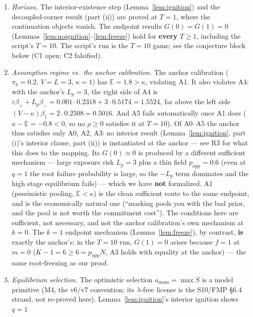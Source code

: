 \begin{remark}\label{rem:ledger}
\leavevmode
\begin{enumerate}
\item \emph{Horizon.} The interior-existence step (Lemma~\ref{lem:ignition}) and the
decoupled-corner result (part (ii)) are proved at $T=1$, where the continuation objects
vanish. The endpoint results $G(0)=G(1)=0$ (Lemmas~\ref{lem:noignition}--\ref{lem:freeze})
hold for \textbf{every} $T\ge 1$, including the script's $T=10$. The script's run is the
$T=10$ game; see the conjecture block below (C1 open; C2 falsified).
\item \emph{Assumption regime vs.\ the anchor calibration.} The anchor calibration
($\pi_b=0.2$, $V=L=3$, $\kappa=1$) has $\mathbb E=1.8>\kappa$, violating A1. It also violates
A4: with the anchor's $L_p=3$, the right side of A4 is
$\varepsilon\beta_++L_p\beta_-=0.001\cdot 0.2318+3\cdot 0.5174=1.5524$, far above the left
side $(V-\kappa)\beta_1=2\cdot 0.2508=0.5016$. And A5 fails automatically once A1 does
($\kappa-\mathbb E=-0.8<0$, so no $\rho\ge 0$ satisfies it at $T=10$). Of A0--A5 the anchor
thus satisfies only A0, A2, A3: no interior result (Lemma~\ref{lem:ignition}, part (i)'s
interior clause, part (ii)) is instantiated at the anchor --- see R3 for what this does to the
mapping. Its $G(0)\approx 0$ is produced by a different sufficient mechanism --- large exposure
risk $L_p=3$ plus a thin field $p_{\mathrm{opp}}=0.6$ (even at $q=1$ the root failure
probability is large, so the $-L_p$ term dominates and the high stage equilibrium fails) ---
which we have \textbf{not} formalized. A1 (pessimistic pooling, $\mathbb E<\kappa$) is the
clean sufficient route to the same endpoint, and is the economically natural one (``masking
pools you with the bad prior, and the pool is not worth the commitment cost''). The conditions
here are sufficient, not necessary, and not the anchor calibration's own mechanism at $k=0$.
The $k=1$ endpoint mechanism (Lemma~\ref{lem:freeze}), by contrast, \textbf{is} exactly the
anchor's: in the $T=10$ run, $G(1)=0$ arises because $f=1$ at $m=0$
($K-1=6\ge 6=p_{\mathrm{opp}}N$, A3 holds with equality at the anchor) --- the same
root-freezing as our proof.
\item \emph{Equilibrium selection.} The optimistic selection $a_{\mathrm{mom}}=\max S$ is a
model primitive (M4, the v6/v7 convention; its $\lambda$-free license is the S10/FMP \S6.4
strand, not re-proved here). Lemma~\ref{lem:ignition}'s interior ignition shows $q=1$

\end{enumerate}
\end{remark}
